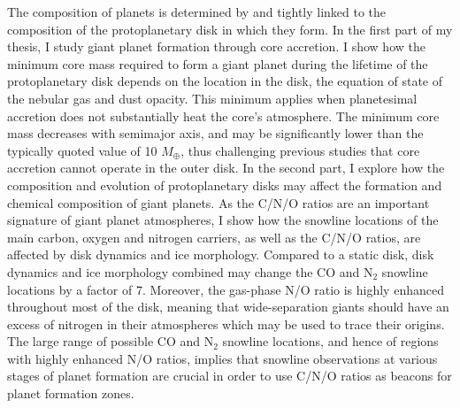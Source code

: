 \doublespacing

The composition of planets is determined by and tightly linked to the composition of the protoplanetary disk in which they form. In the first part of my thesis, I study giant planet formation through core accretion. I show how the minimum core mass required to form a giant planet during the lifetime of the protoplanetary disk depends on the location in the disk, the equation of state of the nebular gas and dust opacity. This minimum applies when planetesimal accretion does not substantially heat the core's atmosphere. The minimum core mass decreases with semimajor axis, and may be significantly lower than the typically quoted value of 10 $M_{\oplus}$, thus challenging previous studies that core accretion cannot operate in the outer disk. In the second part, I explore how the composition and evolution of protoplanetary disks may affect the formation and chemical composition of giant planets. As the C/N/O ratios are an important signature of giant planet atmospheres, I show how the snowline locations of the main carbon, oxygen and nitrogen carriers, as well as the C/N/O ratios, are affected by disk dynamics and ice morphology. Compared to a static disk, disk dynamics and ice morphology combined may change the CO and N$_2$ snowline locations by a factor of 7. Moreover, the gas-phase N/O ratio is highly enhanced throughout most of the disk, meaning that wide-separation giants should have an excess of nitrogen in their atmospheres which may be used to trace their origins. The large range of possible CO and N$_2$ snowline locations, and hence of regions with highly enhanced N/O ratios, implies that snowline observations at various stages of planet formation are crucial in order to use C/N/O ratios as beacons for planet formation zones.  

